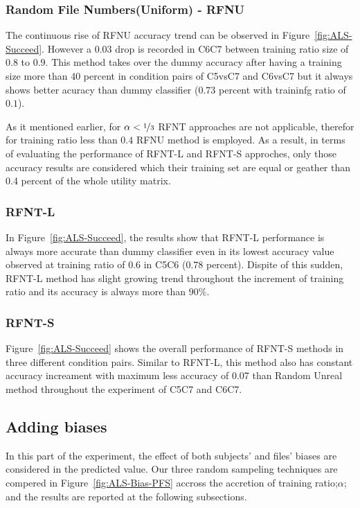 \documentclass[10pt, conference, compsocconf]{IEEEtran}
\begin{document}
\subsubsection{Random File Numbers(Uniform) - RFNU}
The continuous rise of RFNU accuracy trend can be observed in Figure~\ref{fig:ALS-Succeed}.
However a 0.03 drop is recorded in C6C7 between training ratio size of $0.8$ to $0.9$. 
This method takes over the dummy accuracy after having a training size more than 40 percent 
in condition pairs of C5vsC7 and C6vsC7 but it always shows better acuracy than 
dummy classifier ($0.73$ percent with traininfg ratio of $0.1$).\newline

\indent As it mentioned earlier, for $\alpha < \nicefrac{1}{3}$ RFNT approaches are not applicable, 
therefor for training ratio less than $0.4$ RFNU method is employed. As a result, in terms of 
evaluating the performance of RFNT-L and RFNT-S approches, only those accuracy results are 
considered which their training set are equal or geather than 0.4 percent of the whole utility matrix.\newline 

\subsubsection{RFNT-L}

In Figure~\ref{fig:ALS-Succeed}, the results show that RFNT-L performance is always more accurate than
dummy classifier even in its lowest accuracy value observed at training ratio of $0.6$ in C5C6 ($0.78$ percent).
Dispite of this sudden, RFNT-L method has slight growing trend throughout the 
increment of training ratio and its accuracy is always more than $90\%$. 

\subsubsection{RFNT-S}
Figure~\ref{fig:ALS-Succeed} shows the overall performance of RFNT-S methods in three different condition pairs.
Similar to RFNT-L, this method also has constant accuracy increament with maximum less accuracy of 0.07 than 
Random Unreal method throughout the experiment of C5C7 and C6C7.

\subsection{Adding biases}
In this part of the experiment, the effect of both subjects' and files' biases are considered in the predicted value. 
Our three random sampeling techniques are compered in Figure~\ref{fig:ALS-Bias-PFS} accross the accretion of training 
ratio;$\alpha$; and the results are reported at the following subsections.
\end{document}
